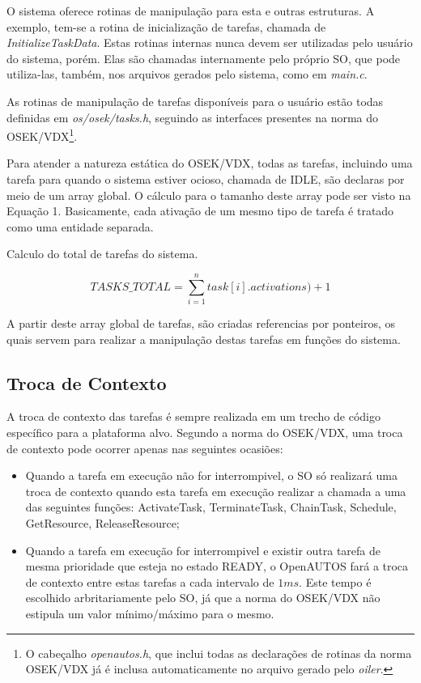 
O sistema oferece rotinas de manipulação para esta e outras estruturas. A exemplo, tem-se a rotina de inicialização de tarefas, chamada de \emph{InitializeTaskData}. Estas rotinas internas nunca devem ser utilizadas pelo usuário do sistema, porém. Elas são chamadas internamente pelo próprio SO, que pode utiliza-las, também, nos arquivos gerados pelo sistema, como em \emph{main.c}.

As rotinas de manipulação de tarefas disponíveis para o usuário estão todas definidas em \emph{os/osek/tasks.h}, seguindo as interfaces presentes na norma do OSEK/VDX\footnote{O cabeçalho \emph{openautos.h}, que inclui todas as declarações de rotinas da norma OSEK/VDX já é inclusa automaticamente no arquivo gerado pelo \emph{oiler}.}.

Para atender a natureza estática do OSEK/VDX, todas as tarefas, incluindo uma tarefa para quando o sistema estiver ocioso, chamada de IDLE, são declaras por meio de um array global. O cálculo para o tamanho deste array pode ser visto na Equação 1. Basicamente, cada ativação de um mesmo tipo de tarefa é tratado como uma entidade separada.

\begin{equacao}[!ht]
	\label{foo}
	\caption{Calculo do total de tarefas do sistema.}
	\begin{equation*}
	TASKS\_TOTAL = \sum\limits_{i=1}^{n} task[i].activations) + 1
	\end{equation*}
\end{equacao}

A partir deste array global de tarefas, são criadas referencias por ponteiros, os quais servem para realizar a manipulação destas tarefas em funções do sistema.

\subsection{Troca de Contexto}

A troca de contexto das tarefas é sempre realizada em um trecho de código específico para a plataforma alvo. Segundo a norma do OSEK/VDX, uma troca de contexto pode ocorrer apenas nas seguintes ocasiões:

\begin{itemize}
	\item Quando a tarefa em execução não for interrompivel, o SO só realizará uma troca de contexto quando esta tarefa em execução realizar a chamada a uma das seguintes funções: ActivateTask, TerminateTask, ChainTask, Schedule, GetResource, ReleaseResource;
	\item Quando a tarefa em execução for interrompivel e existir outra tarefa de mesma prioridade que esteja no estado READY, o OpenAUTOS fará a troca de contexto entre estas tarefas a cada intervalo de $1ms$. Este tempo é escolhido arbritariamente pelo SO, já que a norma do OSEK/VDX não estipula um valor mínimo/máximo para o mesmo.
\end{itemize}

